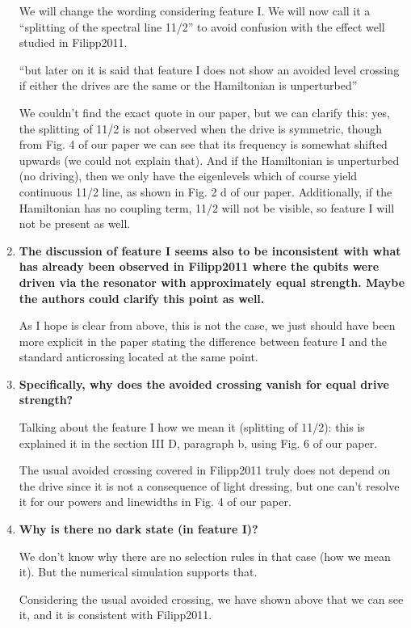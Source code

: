 \documentclass{article}
\begin{document}
\begin{enumerate}
	We will change the wording considering feature I. We will now call it a ``splitting of the spectral line 11/2'' to avoid confusion with the effect well studied in Filipp2011.
	
	``but later on it is said that feature I does
	not show an avoided level crossing if either the drives are the same
	or the Hamiltonian is unperturbed''
	
	We couldn't find the exact quote in our paper, but we can clarify this: yes, the splitting of 11/2 is not observed when the drive is symmetric, though from Fig. 4 of our paper we can see that its frequency is somewhat shifted upwards (we could not explain that). And if the Hamiltonian is unperturbed (no driving), then we only have the eigenlevels which of course yield continuous 11/2 line, as shown in Fig. 2 d of our paper. Additionally, if the Hamiltonian has no coupling term, 11/2 will not be visible, so feature I will not be present as well.
	
	\item \textbf{The discussion of feature I seems also to be inconsistent with what
		has already been observed in Filipp2011 where the qubits were driven
		via the resonator with approximately equal strength. Maybe the authors
		could clarify this point as well.}
	
	As I hope is clear from above, this is not the case, we just should have been more explicit in the paper stating the difference between feature I and the standard anticrossing located at the same point.
	
	\item \textbf{Specifically, why does the avoided crossing vanish for equal drive
		strength?}
	
	Talking about the feature I how we mean it (splitting of 11/2): this is explained it in the section III D, paragraph b, using Fig. 6 of our paper.
	
	The usual avoided crossing covered in Filipp2011 truly does not depend on the drive since it is not a consequence of light dressing, but one can't resolve it for our powers and linewidths in Fig. 4 of our paper.
	
	
	\item \textbf{Why is there no dark state (in feature I)?}
	
	We don't know why there are no selection rules in that case (how we mean it). But the numerical simulation supports that.
	
	Considering the usual avoided crossing, we have shown above that we can see it, and it is consistent with Filipp2011.
	

\end{enumerate}
\end{document}
